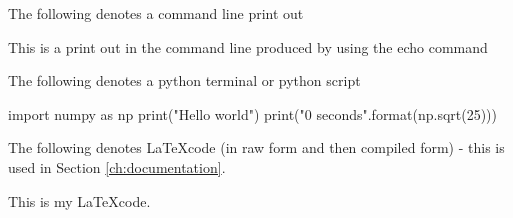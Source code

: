 \noindent The following denotes a command line print out
\begin{cmdboxprint}
 This is a print out in the command line
 produced by using the echo command
\end{cmdboxprint}
\vspace{0.5cm}

\noindent The following denotes a python terminal or python script
\begin{pythonbox}
import numpy as np
print("Hello world")
print("{0} seconds".format(np.sqrt(25)))
\end{pythonbox}
\vspace{0.5cm}

\ifdevguide
\noindent The following denotes \LaTeX code (in raw form and then compiled form) - this is used in Section \ref{ch:documentation}.
\begin{latexbox}
This is my \LaTeX code.
\end{latexbox}
\fi